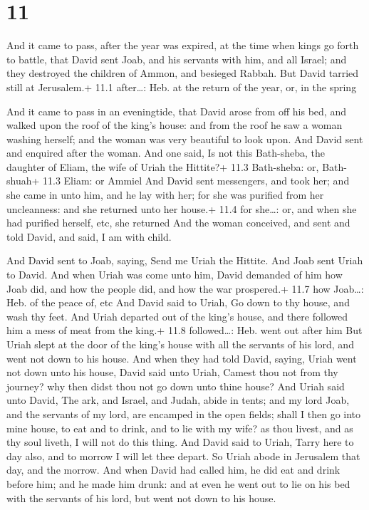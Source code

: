 \hypertarget{section-10}{%
\section{11}\label{section-10}}

 And it came to pass, after the year was expired, at the
time when kings go forth to battle, that David sent Joab, and his
servants with him, and all Israel; and they destroyed the children of
Ammon, and besieged Rabbah. But David tarried still at Jerusalem.+ 11.1
after\ldots: Heb. at the return of the year, or, in the spring

 And it came to pass in an eveningtide, that David arose
from off his bed, and walked upon the roof of the king's house: and from
the roof he saw a woman washing herself; and the woman was very
beautiful to look upon.  And David sent and enquired after
the woman. And one said, Is not this Bath-sheba, the daughter of Eliam,
the wife of Uriah the Hittite?+ 11.3 Bath-sheba: or, Bath-shuah+ 11.3
Eliam: or Ammiel  And David sent messengers, and took her;
and she came in unto him, and he lay with her; for she was purified from
her uncleanness: and she returned unto her house.+ 11.4 for she\ldots:
or, and when she had purified herself, etc, she returned 
And the woman conceived, and sent and told David, and said, I am with
child.

 And David sent to Joab, saying, Send me Uriah the
Hittite. And Joab sent Uriah to David.  And when Uriah was
come unto him, David demanded of him how Joab did, and how the people
did, and how the war prospered.+ 11.7 how Joab\ldots: Heb. of the peace
of, etc  And David said to Uriah, Go down to thy house, and
wash thy feet. And Uriah departed out of the king's house, and there
followed him a mess of meat from the king.+ 11.8 followed\ldots: Heb.
went out after him  But Uriah slept at the door of the
king's house with all the servants of his lord, and went not down to his
house.  And when they had told David, saying, Uriah went
not down unto his house, David said unto Uriah, Camest thou not from thy
journey? why then didst thou not go down unto thine house? 
And Uriah said unto David, The ark, and Israel, and Judah, abide in
tents; and my lord Joab, and the servants of my lord, are encamped in
the open fields; shall I then go into mine house, to eat and to drink,
and to lie with my wife? as thou livest, and as thy soul liveth, I will
not do this thing.  And David said to Uriah, Tarry here to
day also, and to morrow I will let thee depart. So Uriah abode in
Jerusalem that day, and the morrow.  And when David had
called him, he did eat and drink before him; and he made him drunk: and
at even he went out to lie on his bed with the servants of his lord, but
went not down to his house.

